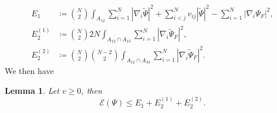 \documentclass[a4paper,11pt]{article}
\newcommand{\abs}[1]{\left\lvert #1 \right\rvert}
\newtheorem{lemma}{Lemma}
\numberwithin{equation}{section}
\begin{document}
	\begin{equation}
	\begin{aligned}
	E_1&\coloneqq\binom{N}{2}\int_{A_{12}} \sum_{i=1}^{N}\abs{\nabla_i\tilde{\Psi}}^2+\sum_{i<j}^{N}v_{ij}\abs{\tilde{\Psi}}^2-\sum_{i=1}^{N}\abs{\nabla_i\Psi_F}^2, \\
	E_2^{(1)}&\coloneqq\binom{N}{2}2N\int_{A_{12}\cap A_{13}}\sum_{i=1}^{N}\abs{\nabla_i\tilde{\Psi}_F}^2,\\ E_2^{(2)}&\coloneqq\binom{N}{2}\binom{N-2}{2}\int_{A_{12}\cap A_{34}}\sum_{i=1}^{N}\abs{\nabla_i\tilde{\Psi}_F}^2.
	\end{aligned}
	\end{equation}
	We then have \begin{lemma}
		Let $ v\geq 0 $, then \begin{equation}\label{EqBound1}
		\mathcal{E}(\Psi)\leq E_1+E_2^{(1)}+E_2^{(2)}.
		\end{equation}
	\end{lemma}
\end{document}
